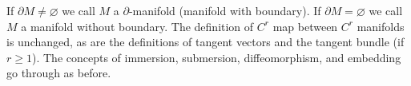 If $\partial M \neq \varnothing$ we call $M$ a $\partial$-manifold (manifold with boundary). If $\partial M = \varnothing$ we call $M$ a manifold without boundary. The definition of $C^r$ map between $C^r$ manifolds is unchanged, as are the definitions of tangent vectors and the tangent bundle (if $r \geqslant 1$). The concepts of immersion, submersion, diffeomorphism, and embedding go through as before.
